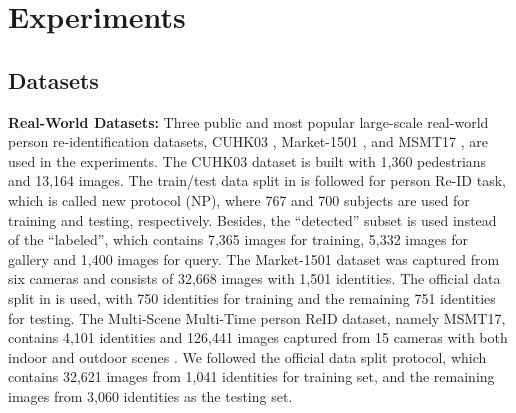 \documentclass[10pt,twocolumn,letterpaper]{article}
\begin{document}
\section{Experiments}

\subsection{Datasets}

\textbf{Real-World Datasets:} Three public and most popular large-scale real-world person re-identification datasets, CUHK03 \cite{li2014deepreid}, Market-1501 \cite{zheng2015scalable}, and MSMT17 \cite{wei2018person}, are used in the experiments. 
The CUHK03 dataset is built with 1,360 pedestrians and 13,164 images. The train/test data split in \cite{zhong2017re} is followed for person Re-ID task, which is called new protocol (NP), where 767 and 700 subjects are used for training and testing, respectively. Besides, the “detected” subset is used instead of the “labeled”, which contains 7,365 images for training, 5,332 images for gallery and 1,400 images for query. The Market-1501 dataset was captured from six cameras and consists of 32,668 images with 1,501 identities. The official data split in \cite{zheng2015scalable} is used, with 750 identities for training and the remaining 751 identities for testing. The Multi-Scene Multi-Time person ReID dataset, namely MSMT17, contains 4,101 identities and 126,441 images captured from 15 cameras with both indoor and outdoor scenes \cite{wei2018person}. We followed the official data split protocol, which contains 32,621 images from 1,041 identities for training set, and the remaining images from 3,060 identities as the testing set. 
\end{document}
